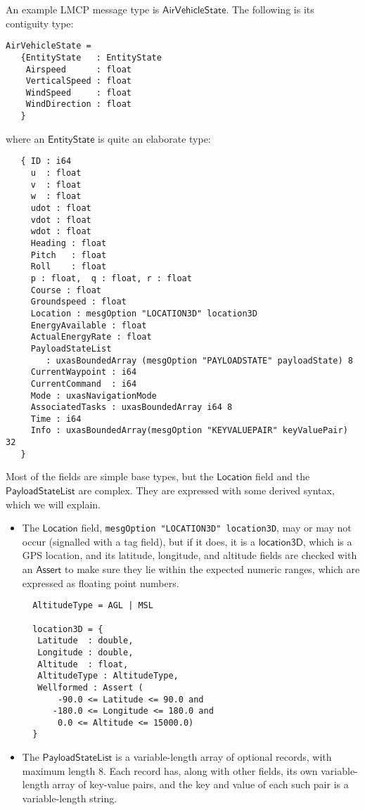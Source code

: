 \documentclass[a4paper,UKenglish,cleveref, autoref, thm-restate]{lipics-v2021}
\newcommand{\konst}[1]{\ensuremath{\mathsf{#1}}}
\begin{document}
An example LMCP message type is \konst{AirVehicleState}. The following
is its contiguity type:

{\small
\begin{verbatim}
AirVehicleState =
   {EntityState   : EntityState
    Airspeed      : float
    VerticalSpeed : float
    WindSpeed     : float
    WindDirection : float
   }
\end{verbatim}
}
\noindent where an \konst{EntityState} is quite an elaborate type:
{\small
\begin{verbatim}
   { ID : i64
     u  : float
     v  : float
     w  : float
     udot : float
     vdot : float
     wdot : float
     Heading : float
     Pitch   : float
     Roll    : float
     p : float,  q : float, r : float
     Course : float
     Groundspeed : float
     Location : mesgOption "LOCATION3D" location3D
     EnergyAvailable : float
     ActualEnergyRate : float
     PayloadStateList
        : uxasBoundedArray (mesgOption "PAYLOADSTATE" payloadState) 8
     CurrentWaypoint : i64
     CurrentCommand  : i64
     Mode : uxasNavigationMode
     AssociatedTasks : uxasBoundedArray i64 8
     Time : i64
     Info : uxasBoundedArray(mesgOption "KEYVALUEPAIR" keyValuePair) 32
   }
\end{verbatim}
}

\noindent Most of the fields are simple base types, but the \konst{Location}
field and the \konst{PayloadStateList} are complex. They are expressed
with some derived syntax, which we will explain.

\begin{itemize}
\item The \konst{Location} field,
  {\small\verb+mesgOption "LOCATION3D" location3D+}, may or may not
  occur (signalled with a tag field), but if it does, it is a
  \konst{location3D}, which is a GPS location, and its latitude,
  longitude, and altitude fields are checked with an \konst{Assert} to
  make sure they lie within the expected numeric ranges, which are
  expressed as floating point numbers.

{\small
\begin{verbatim}
  AltitudeType = AGL | MSL

  location3D = {
   Latitude  : double,
   Longitude : double,
   Altitude  : float,
   AltitudeType : AltitudeType,
   Wellformed : Assert (
       -90.0 <= Latitude <= 90.0 and
      -180.0 <= Longitude <= 180.0 and
       0.0 <= Altitude <= 15000.0)
  }
\end{verbatim}}

\item The \konst{PayloadStateList} is a variable-length array of
  optional records, with maximum length 8. Each record has, along with
  other fields, its own variable-length array of key-value pairs, and
  the key and value of each such pair is a variable-length string.

\end{itemize}
\end{document}

